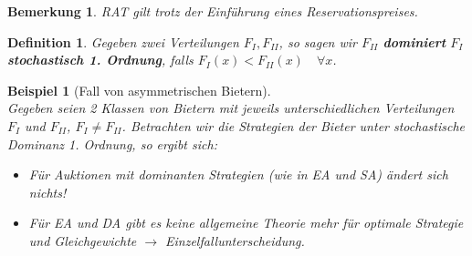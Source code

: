 \documentclass[12pt]{extreport} %
\theoremstyle{named}
\theoremstyle{itshape}
\newtheorem*{definition}{Definition}
\theoremstyle{normal}
\newtheorem{beispiel}[unnamedtheorem]{Beispiel}
\newtheorem*{bemerkung}{Bemerkung}
\begin{document}
\begin{bemerkung}
	RAT gilt trotz der Einführung eines Reservationspreises.
\end{bemerkung}

\begin{definition}
	Gegeben zwei Verteilungen $F_{I}, F_{II}$, so sagen wir $F_{II}$ \textbf{dominiert} $F_{I}$ \textbf{stochastisch 1. Ordnung}, falls $F_{I}(x) < F_{II}(x) \quad \forall x$.
\end{definition}

\begin{beispiel}[Fall von asymmetrischen Bietern] ~\\
	Gegeben seien 2 Klassen von Bietern mit jeweils unterschiedlichen Verteilungen $F_{I}$ und $F_{II}$, $F_{I} \neq F_{II}$. Betrachten wir die Strategien der Bieter unter stochastische Dominanz 1. Ordnung, so ergibt sich:
	\begin{itemize}
		\item Für Auktionen mit dominanten Strategien (wie in EA und SA) ändert sich nichts! 
		\item Für EA und DA gibt es keine allgemeine Theorie mehr für optimale Strategie und Gleichgewichte $\rightarrow$ Einzelfallunterscheidung.
	\end{itemize}	
\end{beispiel}
\end{document}
